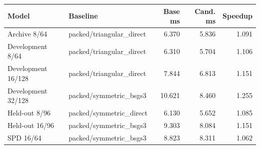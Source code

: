 \begin{tabular}{llrrr}
\toprule
Model & Baseline & Base ms & Cand. ms & Speedup \\
\midrule
Archive 8/64 & packed/triangular\_direct & 6.370 & 5.836 & 1.091 \\
Development 8/64 & packed/triangular\_direct & 6.310 & 5.704 & 1.106 \\
Development 16/128 & packed/triangular\_direct & 7.844 & 6.813 & 1.151 \\
Development 32/128 & packed/symmetric\_bsgs3 & 10.621 & 8.460 & 1.255 \\
Held-out 8/96 & packed/symmetric\_direct & 6.130 & 5.652 & 1.085 \\
Held-out 16/96 & packed/symmetric\_bsgs3 & 9.303 & 8.084 & 1.151 \\
SPD 16/64 & packed/symmetric\_bsgs3 & 8.823 & 8.311 & 1.062 \\
\bottomrule
\end{tabular}
